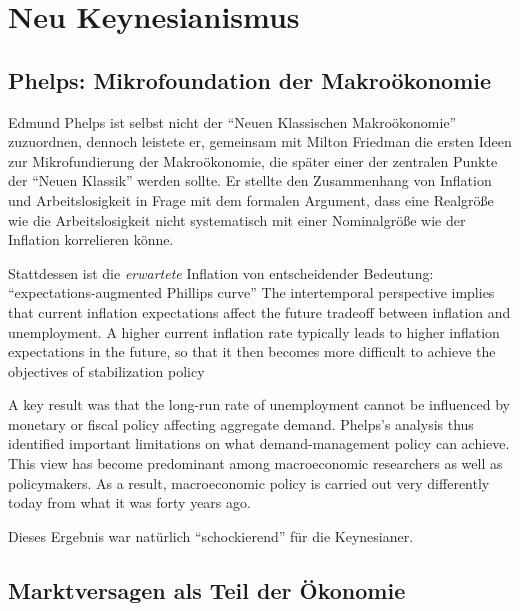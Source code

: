 %
%
%

\chapter{Neu Keynesianismus} \label{cha: Neu Keynes}

\section{Phelps: Mikrofoundation der Makroökonomie}
\label{micmac}

Edmund Phelps ist selbst nicht der "`Neuen Klassischen Makroökonomie"' zuzuordnen, dennoch leistete er, gemeinsam mit Milton Friedman die ersten Ideen zur Mikrofundierung der Makroökonomie, die später einer der zentralen Punkte der "`Neuen Klassik"' werden sollte. Er stellte den Zusammenhang von Inflation und Arbeitslosigkeit in Frage mit dem formalen Argument, dass eine Realgröße wie die Arbeitslosigkeit nicht systematisch mit einer Nominalgröße wie der Inflation korrelieren könne. 

Stattdessen ist die \textit{erwartete} Inflation von entscheidender Bedeutung:  "`expectations-augmented Phillips 
curve"' The intertemporal perspective implies that current inflation expectations affect the future 
tradeoff between inflation and unemployment. A higher current inflation rate typically leads to 
higher inflation expectations in the future, so that it then becomes more difficult to achieve the 
objectives of stabilization policy

A key result was that the long-run rate of unemployment cannot be influenced 
by monetary or fiscal policy affecting aggregate demand. Phelps’s analysis thus identified 
important limitations on what demand-management policy can achieve. This view has become 
predominant among macroeconomic researchers as well as policymakers. As a result, 
macroeconomic policy is carried out very differently today from what it was forty years ago.

Dieses Ergebnis war natürlich "`schockierend"' für die Keynesianer. 




\section{Marktversagen als Teil der Ökonomie}
\label{Marktversagen}

